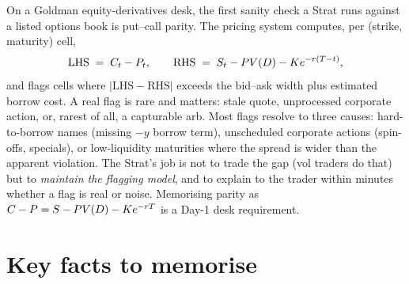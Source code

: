 \begin{gsbox}
On a Goldman equity-derivatives desk, the first sanity check a
Strat runs against a listed options book is put--call parity.
The pricing system computes, per (strike, maturity) cell,
\begin{equation*}
  \mathrm{LHS} \;=\; C_t - P_t,
  \qquad
  \mathrm{RHS} \;=\; S_t - PV(D) - K e^{-r(T-t)},
\end{equation*}
and flags cells where $|\mathrm{LHS} - \mathrm{RHS}|$ exceeds
the bid--ask width plus estimated borrow cost. A real flag is
rare and matters: stale quote, unprocessed corporate action,
or, rarest of all, a capturable arb. Most flags resolve to three
causes: hard-to-borrow names (missing $-y$ borrow term),
unscheduled corporate actions (spin-offs, specials), or
low-liquidity maturities where the spread is wider than the
apparent violation. The Strat's job is not to trade the gap
(vol traders do that) but to \emph{maintain the flagging
model}, and to explain to the trader within minutes whether a
flag is real or noise. Memorising parity as
$C - P = S - PV(D) - K e^{-r T}$ is a
Day-1 desk requirement.
\end{gsbox}

\section{Key facts to memorise}
\label{sec:ch14_keyfacts}


